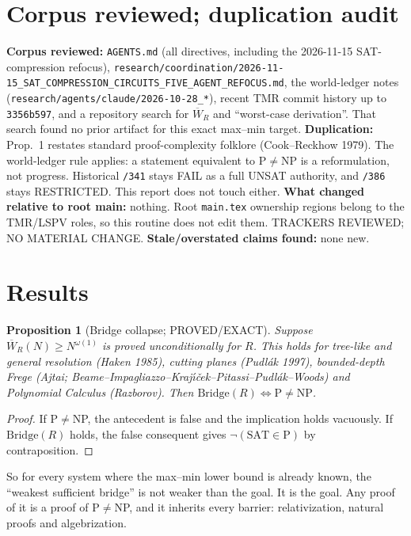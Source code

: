 \documentclass[11pt]{article}
\newtheorem{proposition}{Proposition}
\begin{document}
\section{Corpus reviewed; duplication audit}
\textbf{Corpus reviewed:} \texttt{AGENTS.md} (all directives, including the 2026-11-15 SAT-compression refocus),
\texttt{research/coordination/2026-11-15\_SAT\_COMPRESSION\_CIRCUITS\_FIVE\_AGENT\_REFOCUS.md},
the world-ledger notes (\texttt{research/agents/claude/2026-10-28\_*}), recent TMR commit history up to \texttt{3356b597},
and a repository search for $\overline W_R$ and ``worst-case derivation''. That search found no prior artifact for this exact max--min target.
\textbf{Duplication:} Prop.~1 restates standard proof-complexity folklore (Cook--Reckhow 1979).
The world-ledger rule applies: a statement equivalent to P$\neq$NP is a reformulation, not progress.
Historical \texttt{/341} stays FAIL as a full UNSAT authority, and \texttt{/386} stays RESTRICTED. This report does not touch either.
\textbf{What changed relative to root main:} nothing. Root \texttt{main.tex} ownership regions belong to the TMR/LSPV roles,
so this routine does not edit them. TRACKERS REVIEWED; NO MATERIAL CHANGE.
\textbf{Stale/overstated claims found:} none new.

\section{Results}
\begin{proposition}[Bridge collapse; PROVED/EXACT]
Suppose $\overline W_R(N)\ge N^{\omega(1)}$ is proved unconditionally for $R$. This holds for tree-like and general resolution (Haken 1985),
cutting planes (Pudl\'ak 1997), bounded-depth Frege (Ajtai; Beame--Impagliazzo--Kraj\'\i\v{c}ek--Pitassi--Pudl\'ak--Woods)
and Polynomial Calculus (Razborov). Then $\mathrm{Bridge}(R)\iff \mathrm P\neq\mathrm{NP}$.
\end{proposition}
\begin{proof}
If P$\neq$NP, the antecedent is false and the implication holds vacuously.
If $\mathrm{Bridge}(R)$ holds, the false consequent gives $\neg(\mathrm{SAT}\in\mathrm P)$ by contraposition.
\end{proof}
\noindent So for every system where the max--min lower bound is already known, the ``weakest sufficient bridge'' is not weaker than the goal.
It is the goal. Any proof of it is a proof of P$\neq$NP, and it inherits every barrier: relativization, natural proofs and algebrization.
\end{document}
